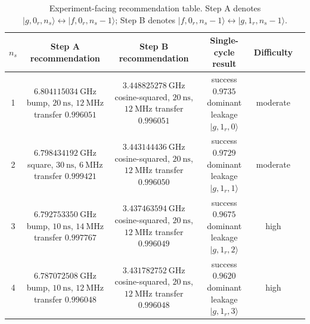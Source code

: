 \documentclass[aps,pra,twocolumn,reprint,floatfix,amsmath,amssymb]{revtex4-2}
\newcommand{\ket}[1]{\lvert #1 \rangle}
\begin{document}
\begin{table}[t]
\caption{Experiment-facing recommendation table. Step A denotes \(\ket{g,0_r,n_s}\leftrightarrow\ket{f,0_r,n_s-1}\); Step B denotes \(\ket{f,0_r,n_s-1}\leftrightarrow\ket{g,1_r,n_s-1}\).}
\label{tab:recommendations}
\scriptsize
\begin{tabular*}{\textwidth}{@{\extracolsep{\fill}}cccccc}
\toprule
\(n_s\) & Step A recommendation & Step B recommendation & Single-cycle result & Difficulty \\
\midrule
1 & \shortstack[c]{\(6.804115034~\si{\giga\hertz}\)\\bump, \(20~\si{\nano\second}\), \(12~\si{\mega\hertz}\)\\transfer \(0.996051\)} & \shortstack[c]{\(3.448825278~\si{\giga\hertz}\)\\cosine-squared, \(20~\si{\nano\second}\), \(12~\si{\mega\hertz}\)\\transfer \(0.996051\)} & \shortstack[c]{success \(0.9735\)\\dominant leakage \(\ket{g,1_r,0}\)} & moderate \\
2 & \shortstack[c]{\(6.798434192~\si{\giga\hertz}\)\\square, \(30~\si{\nano\second}\), \(6~\si{\mega\hertz}\)\\transfer \(0.999421\)} & \shortstack[c]{\(3.443144436~\si{\giga\hertz}\)\\cosine-squared, \(20~\si{\nano\second}\), \(12~\si{\mega\hertz}\)\\transfer \(0.996050\)} & \shortstack[c]{success \(0.9729\)\\dominant leakage \(\ket{g,1_r,1}\)} & moderate \\
3 & \shortstack[c]{\(6.792753350~\si{\giga\hertz}\)\\bump, \(10~\si{\nano\second}\), \(14~\si{\mega\hertz}\)\\transfer \(0.997767\)} & \shortstack[c]{\(3.437463594~\si{\giga\hertz}\)\\cosine-squared, \(20~\si{\nano\second}\), \(12~\si{\mega\hertz}\)\\transfer \(0.996049\)} & \shortstack[c]{success \(0.9675\)\\dominant leakage \(\ket{g,1_r,2}\)} & high \\
4 & \shortstack[c]{\(6.787072508~\si{\giga\hertz}\)\\bump, \(10~\si{\nano\second}\), \(12~\si{\mega\hertz}\)\\transfer \(0.996048\)} & \shortstack[c]{\(3.431782752~\si{\giga\hertz}\)\\cosine-squared, \(20~\si{\nano\second}\), \(12~\si{\mega\hertz}\)\\transfer \(0.996048\)} & \shortstack[c]{success \(0.9620\)\\dominant leakage \(\ket{g,1_r,3}\)} & high \\
\bottomrule
\end{tabular*}
\end{table}
\end{document}
